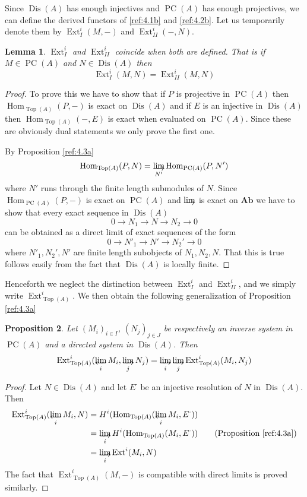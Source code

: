 \documentclass{amsproc}
\DeclareMathOperator{\Dis}{Dis}
\def\Ab{\mathbf{Ab}}
\def\Ext{\operatorname {Ext}}
\def\Hom{\operatorname {Hom}}
\def\r{\rightarrow}
\let\oldtext\text
\def\text#1{\oldtext{\upshape #1}}
\let\invlim\projlim
\DeclareMathOperator{\PC}{PC}
\DeclareMathOperator{\Top}{Top}
\newtheorem{lemma}{Lemma}[section]
\newtheorem{proposition}[lemma]{Proposition}
\theoremstyle{definition}
\theoremstyle{remark}
\def\dirlim{\mathop{\vtop{\baselineskip -100pt\lineskip -1pt\lineskiplimit 0pt
\setbox0\hbox{\upshape lim}\copy0\hbox to \wd0{\rightarrowfill}}}\limits}
\def\invlim{\mathop{\vtop{\baselineskip -100pt\lineskip -1pt\lineskiplimit 0pt
\setbox0\hbox{\upshape lim}\copy0\hbox to \wd0{\leftarrowfill}}}\limits}
\numberwithin{equation}{section}
\numberwithin{table}{section}
\numberwithin{figure}{section}
\begin{document}
Since $\Dis(A)$ has enough injectives and $\PC(A)$ has enough
projectives, we can define the derived functors of \eqref{ref:4.1b} and
\eqref{ref:4.2b}. 
Let us  temporarily denote them by $\Ext_{I}^i(M,-)$ and $\Ext_{I\!
I}^i(-,N)$. 
\begin{lemma} $\Ext_I^i$ and $\Ext_{I\!I}^i$ coincide when both are
defined. That is if $M\in\PC(A)$ and $N\in \Dis(A)$ then
\[
\Ext_I^i(M,N)=\Ext_{I\!I}^i(M,N)
\]
\end{lemma}
\begin{proof} To prove this we have to show that if $P$ is projective in
$\PC(A)$ then $\Hom_{\Top(A)}(P,-)$ is exact on $\Dis(A)$ and if $E$ is
an injective in $\Dis(A)$ then $\Hom_{\Top(A)}(-,E)$ is exact when
evaluated on $\PC(A)$. Since these are obviously dual statements we
only prove the first one.

By Proposition \ref{ref:4.3a}
\[
\Hom_{\Top(A)}(P,N)=\dirlim_{N'} \Hom_{\PC(A)}(P,N')
\]
where $N'$ runs through the finite length submodules of $N$. Since
$\Hom_{\PC(A)}(P,-)$ is exact on $\PC(A)$ and
$\dirlim$ is exact on $\Ab$ we have to show that every exact sequence
in $\Dis(A)$
\[
0\r N_1\r N\r N_2\r 0
\]
can be obtained as a direct limit of exact sequences of the form 
\[
0\r N'_1\r N'\r N_2'\r 0
\]
where $N'_1,N_2',N'$ are finite length subobjects of $N_1,N_2,N$. That
this is true follows easily from the fact that $\Dis(A)$ is locally
finite.
\end{proof}
Henceforth we neglect the distinction between $\Ext_{I}^i$ and
$\Ext_{I\!I}^i$, and we simply write $\Ext^i_{\Top(A)}$.
We then obtain
the following generalization of Proposition \ref{ref:4.3a}
\begin{proposition}
\label{ref:4.5b}
Let $(M_i)_{i\in I}$, $(N_j)_{j\in J}$ be respectively an inverse
system in $\PC(A)$ and a directed system in $\Dis(A)$. Then
\begin{equation}
\label{ref:4.7a}
\Ext^i_{\Top(A)}(\invlim_i M_i,\dirlim_j
N_j)=\dirlim_i\dirlim_j\Ext^i_{\Top(A)}(M_i,N_j)
\end{equation}
\end{proposition}
\begin{proof}
Let $N\in \Dis(A)$ and let $E^\cdot$ be an injective resolution of $N$ in
$\Dis(A)$. Then
\begin{align*}
\Ext^i_{\Top(A)}(\invlim_i M_i,N)&=H^i(\Hom_{\Top(A)}(\invlim_i
M_i,E^\cdot))\\
&=\dirlim_i H^i(\Hom_{\Top(A)}(M_i,E^\cdot))\qquad \text{(Proposition
\ref{ref:4.3a})}
\\ &=\dirlim_i \Ext^i(M_i,N)
\end{align*}
The fact that $\Ext^i_{\Top(A)}(M,-)$ is compatible with direct limits is
proved similarly.
\end{proof}
\end{document}
